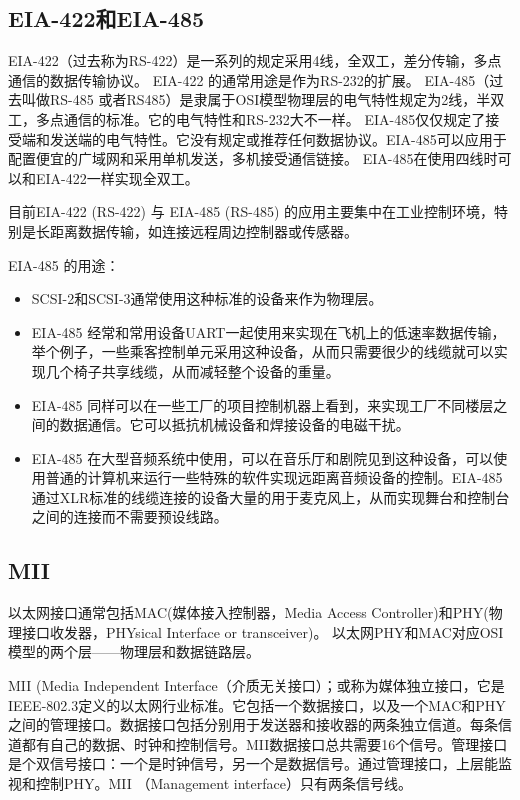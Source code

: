 \subsection{EIA-422和EIA-485}
EIA-422（过去称为RS-422）是一系列的规定采用4线，全双工，差分传输，多点通信的数据传输协议。
EIA-422 的通常用途是作为RS-232的扩展。
EIA-485（过去叫做RS-485 或者RS485）是隶属于OSI模型物理层的电气特性规定为2线，半双工，多点通信的标准。它的电气特性和RS-232大不一样。
EIA-485仅仅规定了接受端和发送端的电气特性。它没有规定或推荐任何数据协议。EIA-485可以应用于配置便宜的广域网和采用单机发送，多机接受通信链接。
EIA-485在使用四线时可以和EIA-422一样实现全双工。

目前EIA-422 (RS-422) 与 EIA-485 (RS-485) 的应用主要集中在工业控制环境，特别是长距离数据传输，如连接远程周边控制器或传感器。

EIA-485 的用途：
\begin{itemize}
\item
    SCSI-2和SCSI-3通常使用这种标准的设备来作为物理层。
\item
    EIA-485 经常和常用设备UART一起使用来实现在飞机上的低速率数据传输，举个例子，一些乘客控制单元采用这种设备，从而只需要很少的线缆就可以实现几个椅子共享线缆，从而减轻整个设备的重量。
\item
    EIA-485 同样可以在一些工厂的项目控制机器上看到，来实现工厂不同楼层之间的数据通信。它可以抵抗机械设备和焊接设备的电磁干扰。
\item
    EIA-485 在大型音频系统中使用，可以在音乐厅和剧院见到这种设备，可以使用普通的计算机来运行一些特殊的软件实现远距离音频设备的控制。EIA-485通过XLR标准的线缆连接的设备大量的用于麦克风上，从而实现舞台和控制台之间的连接而不需要预设线路。
\end{itemize}


\subsection{MII}
以太网接口通常包括MAC(媒体接入控制器，Media Access Controller)和PHY(物理接口收发器，PHYsical Interface or transceiver)。
以太网PHY和MAC对应OSI模型的两个层——物理层和数据链路层。


MII (Media Independent Interface（介质无关接口）；或称为媒体独立接口，它是IEEE-802.3定义的以太网行业标准。它包括一个数据接口，以及一个MAC和PHY之间的管理接口。数据接口包括分别用于发送器和接收器的两条独立信道。每条信道都有自己的数据、时钟和控制信号。MII数据接口总共需要16个信号。管理接口是个双信号接口：一个是时钟信号，另一个是数据信号。通过管理接口，上层能监视和控制PHY。MII （Management interface）只有两条信号线。

